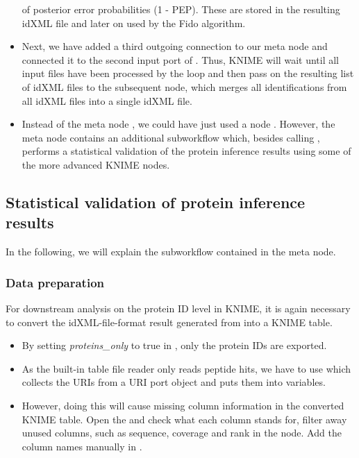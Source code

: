 \begin{itemize}
of posterior error probabilities (1 - PEP). These are stored in the resulting idXML file and later on used by the Fido algorithm.
\item Next, we have added a third outgoing connection to our  meta node and connected it to the second input port of .
Thus, KNIME will wait until all input files have been processed by the loop and then pass on the resulting list of idXML files to the subsequent
 node, which merges all identifications from all idXML files into a single idXML file.
\item Instead of the meta node , we could have just used a  node
. However, the meta node contains an additional subworkflow which, besides calling ,
performs a statistical validation of the protein inference results using some of the more advanced KNIME nodes.
\end{itemize}

\subsection{Statistical validation of protein inference results}

In the following, we will explain the subworkflow contained in the  meta node.

\subsubsection{Data preparation}
For downstream analysis on the protein ID level in KNIME, it is again necessary to convert the idXML-file-format result generated from  into a KNIME table.

\begin{itemize}
\item By setting \textit{proteins\_only} to true in , only the protein IDs are exported. 
\item As the built-in table file reader  only reads peptide hits, we have to use  which collects the URIs from a URI port object and puts them into variables. 
\item However, doing this will cause missing column information in the converted KNIME table. Open the  and check what each column stands for, filter away unused columns, such as sequence, coverage and rank in the  node. Add the column names manually in . 
\end{itemize}

